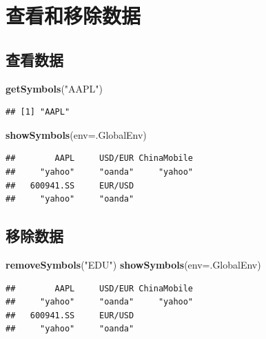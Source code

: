 \documentclass[]{ctexbook}
\newenvironment{Shaded}{\begin{snugshade}}{\end{snugshade}}
\newcommand{\AttributeTok}[1]{\textcolor[rgb]{0.13,0.29,0.53}{#1}}
\newcommand{\FunctionTok}[1]{\textcolor[rgb]{0.13,0.29,0.53}{\textbf{#1}}}
\newcommand{\NormalTok}[1]{#1}
\newcommand{\StringTok}[1]{\textcolor[rgb]{0.31,0.60,0.02}{#1}}
\begin{document}
\section{查看和移除数据}\label{ux67e5ux770bux548cux79fbux9664ux6570ux636e}

\subsection{查看数据}\label{ux67e5ux770bux6570ux636e}

\begin{Shaded}
\begin{Highlighting}[]
\FunctionTok{getSymbols}\NormalTok{(}\StringTok{"AAPL"}\NormalTok{)}
\end{Highlighting}
\end{Shaded}

\begin{verbatim}
## [1] "AAPL"
\end{verbatim}

\begin{Shaded}
\begin{Highlighting}[]
\FunctionTok{showSymbols}\NormalTok{(}\AttributeTok{env=}\NormalTok{.GlobalEnv)}
\end{Highlighting}
\end{Shaded}

\begin{verbatim}
##        AAPL     USD/EUR ChinaMobile 
##     "yahoo"     "oanda"     "yahoo" 
##   600941.SS     EUR/USD 
##     "yahoo"     "oanda"
\end{verbatim}

\subsection{移除数据}\label{ux79fbux9664ux6570ux636e}

\begin{Shaded}
\begin{Highlighting}[]
\FunctionTok{removeSymbols}\NormalTok{(}\StringTok{"EDU"}\NormalTok{)}
\FunctionTok{showSymbols}\NormalTok{(}\AttributeTok{env=}\NormalTok{.GlobalEnv)}
\end{Highlighting}
\end{Shaded}

\begin{verbatim}
##        AAPL     USD/EUR ChinaMobile 
##     "yahoo"     "oanda"     "yahoo" 
##   600941.SS     EUR/USD 
##     "yahoo"     "oanda"
\end{verbatim}
\end{document}
